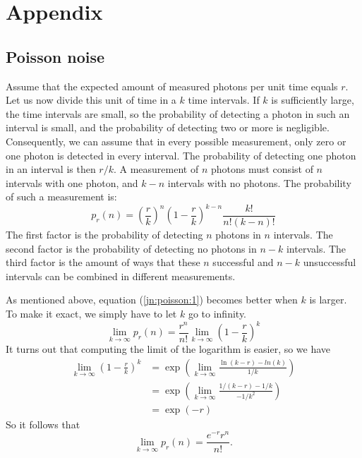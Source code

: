 \chapter{Appendix}

\section{Poisson noise}  \label{app:poisson}
Assume that the expected amount of measured photons per unit time equals $r$.
Let us now divide this unit of time in a $k$ time intervals. If $k$ is
sufficiently large, the time intervals are small, so the probability of
detecting a photon in such an interval is small, and the probability of
detecting two or more is negligible. Consequently, we can assume that in every
possible measurement, only zero or one photon is detected in every
interval. The probability of detecting one photon in an interval is then $r /
k$. A measurement of $n$ photons must consist of $n$ intervals with one
photon, and $k - n$ intervals with no photons. The probability of such a
measurement is:
\begin{equation}
p_r(n) = \left( \frac{r}{k} \right)^n \left(1 - \frac{r}{k} \right)^{k-n}
       \frac{k!}{n!(k-n)!}  \label{jn:poisson:1}
\end{equation}
The first factor is the probability of detecting $n$ photons in $n$ intervals.
The second factor is the probability of detecting no photons in $n - k$
intervals.  The third factor is the amount of ways that these $n$ successful
and $n-k$ unsuccessful intervals can be combined in different measurements.

As mentioned above, equation (\ref{jn:poisson:1}) becomes better when $k$ is
larger.  To make it exact, we simply have to let $k$ go to infinity.
\begin{equation}
  \lim_{k \rightarrow \infty} p_r(n) 
  = \frac{r^n}{n!} \lim_{k \rightarrow \infty} \left( 1 - \frac{r}{k} \right)^k
\end{equation}
It turns out that computing the limit of the logarithm is easier, so we have
\begin{align}
  \lim_{k \rightarrow \infty} \left( 1 - \frac{r}{k} \right)^k
 &=
 \exp \left(\lim_{k \rightarrow \infty} \frac{\ln(k - r) - ln(k)}{1/k}  \right)
\nonumber\\
&= 
  \exp \left(\lim_{k \rightarrow \infty}  
  \frac{1/ (k-r) - 1/k}{-1/k^2} \right) \nonumber \\
&= \exp (-r)
\end{align}
So it follows that 
\begin{equation}
  \lim_{k \rightarrow \infty} p_r(n) = \frac{e^{-r} r^n}{n!}. 
\end{equation}

